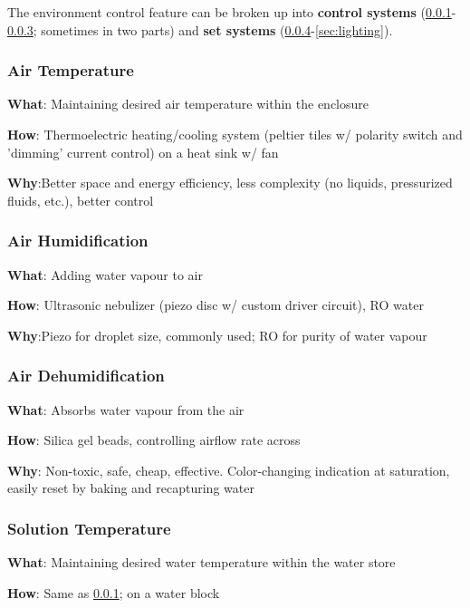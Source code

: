 \documentclass{report}
\begin{document}
The environment control feature can be broken up into \textbf{control systems} (\ref{sec:airtemp}-\ref{sec:dehum}; sometimes in two parts) and \textbf{set systems} (\ref{sec:watertemp}-\ref{sec:lighting}).

\subsubsection{Air Temperature}
\label{sec:airtemp}

\textbf{What}: Maintaining desired air temperature within the enclosure

\textbf{How}: Thermoelectric heating/cooling system (peltier tiles w/ polarity switch and 'dimming' current control) on a heat sink w/ fan

\textbf{Why}:Better space and energy efficiency, less complexity (no liquids, pressurized fluids, etc.), better control

\subsubsection{Air Humidification}
\label{sec:airhum}

\textbf{What}: Adding water vapour to air

\textbf{How}: Ultrasonic nebulizer (piezo disc w/ custom driver circuit), RO water

\textbf{Why}:Piezo for droplet size, commonly used; RO for purity of water vapour

\subsubsection{Air Dehumidification}
\label{sec:dehum}

\textbf{What}: Absorbs water vapour from the air

\textbf{How}: Silica gel beads, controlling airflow rate across

\textbf{Why}: Non-toxic, safe, cheap, effective. Color-changing indication at saturation, easily reset by baking and recapturing water

\subsubsection{Solution Temperature}
\label{sec:watertemp}

\textbf{What}: Maintaining desired water temperature within the water store

\textbf{How}: Same as \ref{sec:airtemp}; on a water block
\end{document}
